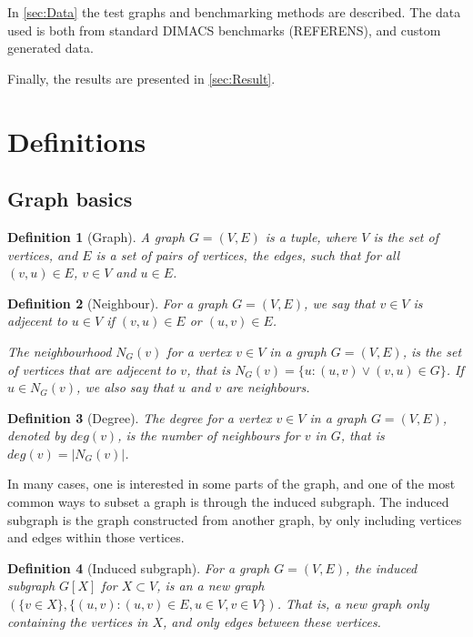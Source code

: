 \documentclass{amsart}
\newtheorem{definition}{Definition}[section]
\begin{document}
In \autoref{sec:Data} the test graphs and benchmarking methods are described. The data
used is both from standard DIMACS benchmarks (REFERENS), and custom generated data.

Finally, the results are presented in \autoref{sec:Result}.

\section{Definitions}
\label{sec:Definitions}

\subsection{Graph basics}
\label{sec:GraphBasics}

\begin{definition}[Graph]
    A graph $G = (V,E)$ is a tuple, where $V$ is the set of vertices, and $E$ is
    a set of pairs of vertices, the edges, such that for all $(v,u) \in E$,
    $v \in V$ and $u \in E$.
\end{definition}
\begin{definition}[Neighbour]
    For a graph $G = (V,E)$, we say that $v \in V$ is adjecent to 
    $u \in V$ if $(v,u) \in E$ or $(u,v) \in E$. 

    The neighbourhood $N_G(v)$ for a vertex $v \in V$ in a graph $G = (V,E)$,
    is the set of vertices that are adjecent to $v$, that is 
    $N_G(v) = \{u : (u,v) \vee (v,u) \in G\}$. If $u \in N_G(v)$, we also say
    that $u$ and $v$ are neighbours.
\end{definition}

\begin{definition}[Degree]
    The degree for a vertex $v \in V$ in a graph $G = (V,E)$, denoted by 
    $deg(v)$, is the number of neighbours for $v$ in $G$, that is 
    $deg(v) = |N_G(v)|$.

\end{definition}

In many cases, one is interested in some parts of the graph, and one of the
most common ways to subset a graph is through the induced subgraph. The induced
subgraph is the graph constructed from another graph, by only including vertices
and edges within those vertices. 

\begin{definition}[Induced subgraph]
    
    For a graph $G = (V,E)$, the induced subgraph $G[X]$ for $X \subset V$, is
    an a new graph $(\{v \in X\},\{(u,v) : (u,v) \in E, u \in V,v \in V\})$. That
    is, a new graph only containing the vertices in $X$, and only edges between
    these vertices.

\end{definition}
\end{document}
